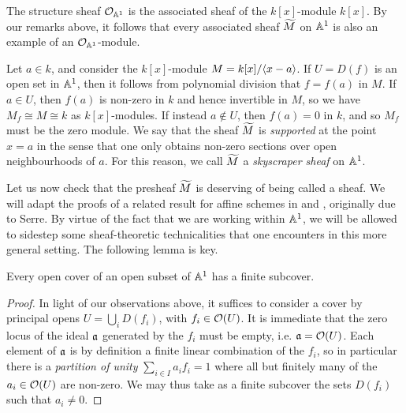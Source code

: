 \begin{example}
  The structure sheaf $\mathcal{O}_{{\mathbb{A}^{{1}}}}$ is the associated sheaf of
  the $k[x]$-module $k[x]$.
  By our remarks above, it follows that every associated sheaf
  $\widetilde{{M}}$ on $\mathbb{A}^{{1}}$ is also an example of an $\mathcal{O}_{{\mathbb{A}^{{1}}}}$-module.
\end{example}

\begin{example}
  \label{exmp_skyscraper_shf}
  Let $a \in k$, and consider the $k[x]$-module $M = {k[x]}\mathopen/{\left\langle {x - a} \right\rangle}$.
  If $U = D(f)$ is an open set in $\mathbb{A}^{{1}}$, then it follows from
  polynomial division that $f = f(a)$ in $M$.
  If $a \in U$, then $f(a)$ is non-zero in $k$ and hence invertible
  in $M$, so we have $M_f \cong M \cong k$ as $k[x]$-modules.
  If instead $a \not\in U$, then $f(a) = 0$ in $k$, and so $M_f$ must
  be the zero module.
  We say that the sheaf $\widetilde{{M}}$ is \emph{supported} at the point
  $x = a$ in the sense that one only obtains non-zero sections over
  open neighbourhoods of $a$.
  For this reason, we call $\widetilde{{M}}$ a \emph{skyscraper sheaf} on $\mathbb{A}^{{1}}$.
\end{example}

Let us now check that the presheaf $\widetilde{{M}}$ is deserving of being
called a sheaf.
We will adapt the proofs of a related result for affine schemes in
\cite[Proposition~I.18]{eisenbud_and_harris} and
\cite[Theorem~4.1.2]{vakil}, originally due to Serre.
By virtue of the fact that we are working within $\mathbb{A}^{{1}}$, we will
be allowed to sidestep some sheaf-theoretic technicalities that one
encounters in this more general setting.
The following lemma is key.

\begin{lemma}
  \label{lemma_quasiaff_is_quasicompact}
  Every open cover of an open subset of $\mathbb{A}^{{1}}$ has a finite subcover.
\end{lemma}

\begin{proof}
  In light of our observations above, it suffices to consider a cover
  by principal opens $U = \bigcup_i D(f_i)$, with $f_i \in \mathcal{O}(U)$.
  It is immediate that the zero locus of the ideal $\mathfrak{a}$
  generated by the $f_i$ must be empty, i.e. $\mathfrak{a} = \mathcal{O}(U)$.
  Each element of $\mathfrak{a}$ is by definition a finite linear
  combination of the $f_i$, so in particular there is a
  \emph{partition of unity} $\sum_{i \in I} a_i f_i = 1$ where all
  but finitely many of the $a_i \in \mathcal{O}(U)$ are non-zero.
  We may thus take as a finite subcover the sets $D(f_i)$ such that
  $a_i \neq 0$.
\end{proof}

